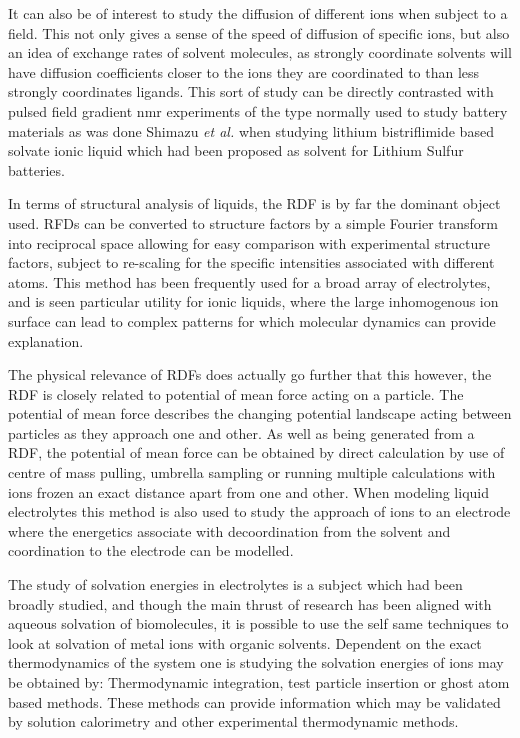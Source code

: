 \documentclass[../main.tex]{subfiles}
\begin{document}
It can also be of interest to study the diffusion of different ions when subject to a field. This not only gives a sense of the speed of diffusion of specific ions, but also an idea of exchange rates of solvent molecules, as strongly coordinate solvents will have diffusion coefficients closer to the ions they are coordinated to than less strongly coordinates ligands\cite{shimizu_structural_2015,lesch_influence_2015,borodin_litfsi_2006,borodin_li_2006,borodin_li_2007}. This sort of study can be directly contrasted with pulsed field gradient nmr experiments of the type normally used to study battery materials as was done Shimazu \textit{et al.} when studying lithium bistriflimide based solvate ionic liquid which had been proposed as solvent for Lithium Sulfur batteries\cite{shimizu_structural_2015}.

In terms of structural analysis of liquids, the RDF is by far the dominant object used. RFDs can be converted to structure factors by a simple Fourier transform into reciprocal space allowing for easy comparison with experimental structure factors\cite{shimizu_structural_2015,pethes_comparison_2017,hanke_intermolecular_2001,tsuzuki_molecular_2009}, subject to re-scaling for the specific intensities associated with different atoms. This method has been frequently used for a broad array of electrolytes, and is seen particular utility for ionic liquids, where the large inhomogenous ion surface can lead to complex patterns for which molecular dynamics can provide explanation.

The physical relevance of RDFs does actually go further that this however, the RDF is closely related to potential of mean force acting on a particle. The potential of mean force describes the changing potential landscape acting between particles as they approach one and other\cite{frenkel_understanding_2002}. As well as being generated from a RDF, the potential of mean force can be obtained by direct calculation by use of centre of mass pulling, umbrella sampling\cite{lindahl_gromacs_2021} or running multiple calculations with ions frozen an exact distance apart from one and other. When modeling liquid electrolytes this method is also used to study the approach of ions to an electrode where the energetics associate with decoordination from the solvent and coordination to the electrode can be modelled\cite{coles_nanostructure_2017,sergeev_electrodeelectrolyte_2017}.

The study of solvation energies in electrolytes is a subject which had been broadly studied, and though the main thrust of research has been aligned with aqueous solvation of biomolecules, it is possible to use the self same techniques to look at solvation of metal ions with organic solvents. Dependent on the exact thermodynamics of the system one is studying the solvation energies of ions may be obtained by: Thermodynamic integration, test particle insertion or ghost atom based methods. These methods can provide information which may be validated by solution calorimetry and other experimental thermodynamic methods.
\end{document}
